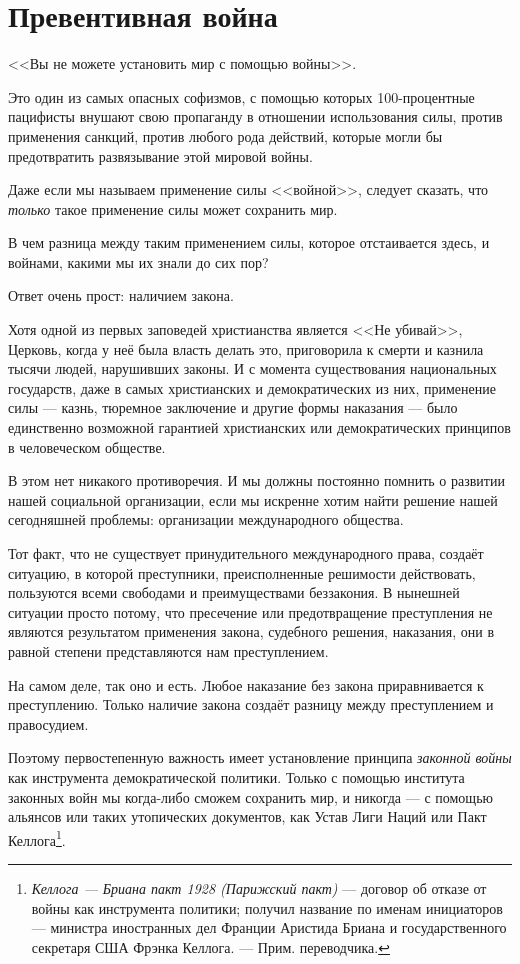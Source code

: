 \chapter{Превентивная война}

<<Вы не можете установить мир с помощью войны>>.
 
Это один из самых опасных софизмов, с помощью которых 100-процентные пацифисты внушают свою пропаганду в отношении использования силы, против применения санкций, против любого рода действий, которые могли бы предотвратить развязывание этой мировой войны.

Даже если мы называем применение силы <<войной>>, следует сказать, что \textit{только} такое применение силы может сохранить мир.
 
В чем разница между таким применением силы, которое отстаивается здесь, и войнами, какими мы их знали до сих пор?

Ответ очень прост: наличием закона.

Хотя одной из первых заповедей христианства является <<Не убивай>>, Церковь, когда у неё была власть делать это, приговорила к смерти и казнила тысячи людей, нарушивших законы. И с момента существования национальных государств, даже в самых христианских и демократических из них, применение силы — казнь, тюремное заключение и другие формы наказания — было единственно возможной гарантией христианских или демократических принципов в человеческом обществе.

В этом нет никакого противоречия. И мы должны постоянно помнить о развитии нашей социальной организации, если мы искренне хотим найти решение нашей сегодняшней проблемы: организации международного общества.

Тот факт, что не существует принудительного международного права, создаёт ситуацию, в которой преступники, преисполненные решимости действовать, пользуются всеми свободами и преимуществами беззакония. В нынешней ситуации просто потому, что пресечение или предотвращение преступления не являются результатом применения закона, судебного решения, наказания, они в равной степени представляются нам преступлением.

На самом деле, так оно и есть. Любое наказание без закона приравнивается к преступлению. Только наличие закона создаёт разницу между преступлением и правосудием.

Поэтому первостепенную важность имеет установление принципа \textit{законной войны} как инструмента демократической политики. Только с помощью института законных войн мы когда-либо сможем сохранить мир, и никогда — с помощью альянсов или таких утопических документов, как Устав Лиги Наций или Пакт Келлога\footnote{%
\textit{Келлога — Бриана пакт 1928 (Парижский пакт)} — до­го­вор об от­ка­зе от вой­ны как ин­ст­ру­мен­та по­ли­ти­ки; получил название по именам инициаторов — министра иностранных дел Франции Аристида Бриана и государственного секретаря США Фрэнка Келлога. — Прим. переводчика.}.

